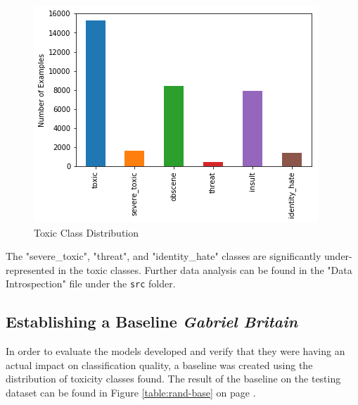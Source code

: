 \documentclass{article}
\begin{document}
{{	  \begin{figure}[h]
		  \centering
		  \includegraphics[width=\textwidth]{toxic-distribution.png}
		  \caption{Toxic Class Distribution}
		  \label{fig:toxic-dist}
	  \end{figure}
  }
  The "severe\_toxic", "threat", and "identity\_hate" classes are significantly
  under-represented in the toxic classes. Further data analysis can be found in
  the "Data Introspection" file under the \texttt{src} folder.

  \subsection{Establishing a Baseline \textit{Gabriel Britain}}{
	  In order to evaluate the models developed and verify that they were having
	  an actual impact on classification quality, a baseline was created using the
	  distribution of toxicity classes found. The result of the baseline on the
	  testing dataset can be found in Figure \ref{table:rand-base} on page
	  \pageref{table:rand-base}.

}}
\end{document}
